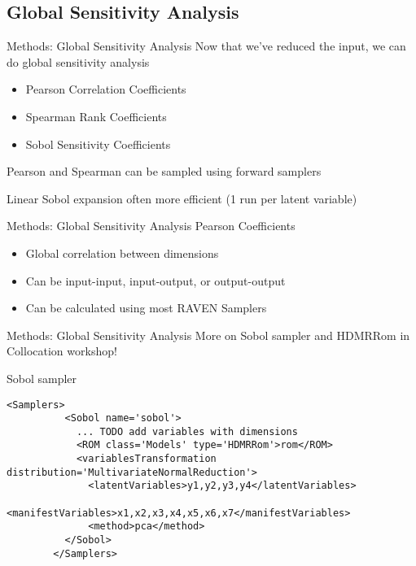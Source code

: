 \documentclass[t,9pt,svgnames]{beamer}
\newenvironment{codebox}{}{}
\begin{document}
\subsection{Global Sensitivity Analysis}
\begin{frame}{Methods: Global Sensitivity Analysis}
  Now that we've reduced the input, we can do global sensitivity analysis
  \begin{itemize}
    \item Pearson Correlation Coefficients
    \item Spearman Rank Coefficients
    \item Sobol Sensitivity Coefficients
  \end{itemize}
  Pearson and Spearman can be sampled using forward samplers

  Linear Sobol expansion often more efficient (1 run per latent variable)
\end{frame}

\begin{frame}{Methods: Global Sensitivity Analysis}
  Pearson Coefficients
  \begin{itemize}
    \item Global correlation between dimensions
    \item Can be input-input, input-output, or output-output
    \item Can be calculated using most RAVEN Samplers
  \end{itemize}
\end{frame}

\begin{frame}[fragile]{Methods: Global Sensitivity Analysis}
  More on Sobol sampler and HDMRRom in Collocation workshop!

  Sobol sampler
  \begin{codebox}
    \begin{lstlisting}[emph={y1,y2,y3,Sobol,rom}]
        <Samplers>
          <Sobol name='sobol'>
            ... TODO add variables with dimensions
            <ROM class='Models' type='HDMRRom'>rom</ROM>
            <variablesTransformation distribution='MultivariateNormalReduction'>
              <latentVariables>y1,y2,y3,y4</latentVariables>
              <manifestVariables>x1,x2,x3,x4,x5,x6,x7</manifestVariables>
              <method>pca</method>
          </Sobol>
        </Samplers>
    \end{lstlisting}
  \end{codebox}
\end{frame}
\end{document}
